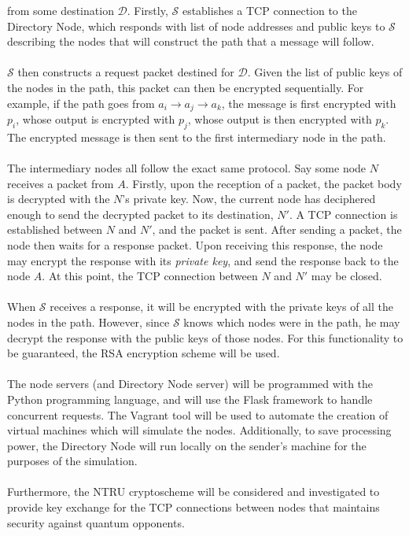 \documentclass[10pt]{article}
\begin{document}
from some destination $\mathcal{D}$.
Firstly, $\mathcal{S}$ establishes a TCP connection to the Directory Node,
which responds with  list of node addresses and public keys to $\mathcal{S}$ describing the nodes that
will construct the path that a message will follow. \\\\
$\mathcal{S}$ then constructs a request packet destined for $\mathcal{D}$. Given the list of
public keys of the nodes in the path, this packet can then be encrypted
sequentially. For example, if the path goes from $a_i\rightarrow a_j\rightarrow
a_k$, the message is first encrypted with $p_i$, whose output is encrypted with
$p_j$, whose output is then encrypted with $p_k$. The encrypted message
is then sent to the first intermediary node in the path.\\\\
The intermediary nodes all follow the exact same protocol. Say some node $N$
receives a packet from $A$. Firstly, upon the
reception of a packet, the packet body is decrypted with the $N$'s
private key. Now, the current node has deciphered enough to send the decrypted
packet to its destination, $N'$. A TCP connection is established between $N$
and $N'$, and the packet is sent. After sending a packet, the node then waits for a
response packet. Upon receiving this response, the node may encrypt the
response with its \textit{private key}, and send the response back to the node
$A$. At this point, the TCP connection between $N$ and $N'$ may be closed.\\\\
When $\mathcal{S}$ receives a response, it will be encrypted with the private keys of
all the nodes in the path. However, since $\mathcal{S}$ knows which nodes were in the
path, he may decrypt the response with the public keys of those nodes. For this
functionality to be guaranteed, the RSA encryption scheme will be used.\\\\
The node servers (and Directory Node server) will be programmed with the Python
programming language, and will use the Flask framework to handle concurrent
requests. The Vagrant tool will be used to automate the creation of virtual
machines which will simulate the nodes. Additionally, to save processing power,
the Directory Node will run locally on the sender's machine for the purposes of
the simulation.\\\\
Furthermore, the NTRU cryptoscheme will be considered and investigated to
provide key exchange for the TCP connections between nodes that maintains
security against quantum opponents.
\end{document}
